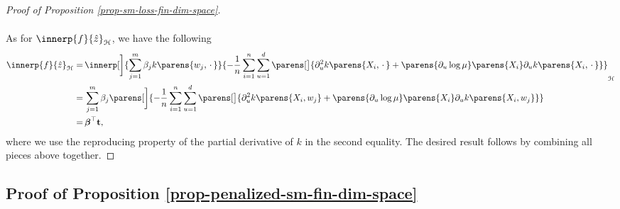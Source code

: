 \begin{proof}[Proof of Proposition \ref{prop-sm-loss-fin-dim-space}]
\begin{align*}
	\end{align*}

	As for $\innerp{f}{\hat{z}}_{\calH}$, we have the following 
	\begin{align*}
		\innerp{f}{\hat{z}}_{\calH} = & \, \innerp[\bigg]{\sum_{j=1}^m \beta_j k \parens{w_j, \,\cdot\,}}{- \frac{1}{n} \sum_{i=1}^n \sum_{u=1}^d \parens[\big]{\partial_u^2 k \parens{X_i, \,\cdot\,} + \parens{\partial_u \log \mu} \parens{X_i} \partial_u k \parens{X_i, \,\cdot\,}}}_{\calH} \\ 
		= & \, \sum_{j=1}^m \beta_j \parens[\bigg]{- \frac{1}{n} \sum_{i=1}^n \sum_{u=1}^d \parens[\big]{\partial_u^2 k \parens{X_i, w_j} + \parens{\partial_u \log \mu} \parens{X_i} \partial_u k \parens{X_i, w_j}} } \\ 
		= & \, \bbeta^\top \bt, 
	\end{align*}
	where we use the reproducing property of the partial derivative of $k$ in the second equality. The desired result follows by combining all pieces above together. 
\end{proof}


\subsection{Proof of Proposition \ref{prop-penalized-sm-fin-dim-space}}\label{proof-prop-penalized-sm-fin-dim-space}


